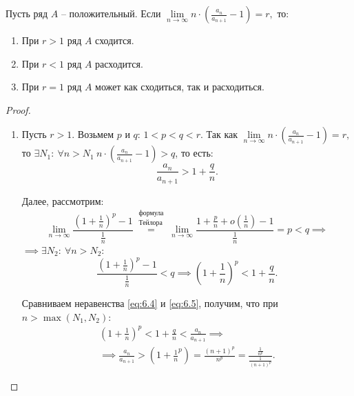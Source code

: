

\begin{theorem}
    Пусть ряд $A$ -- положительный. Если $ \underset{n\rightarrow\infty}{\lim}n \cdot \left(\frac{a_n}{a_{n+1}} - 1\right) = r, $ то:
    \begin{enumerate}
        \item При $r>1$ ряд $A$ сходится.
        \item При $r<1$ ряд $A$ расходится.
        \item При $r=1$ ряд $A$ может как сходиться, так и расходиться.
    \end{enumerate}
\end{theorem}

\begin{proof}\leavevmode
    \begin{enumerate}
        \item Пусть $r>1$. Возьмем $p$ и $q$: $ 1 < p < q < r $. Так как $ \underset{n\rightarrow\infty}{\lim}n\cdot\left(\frac{a_n}{a_{n+1}} - 1\right) = r, $ то $\exists N_1: \ \forall n > N_1 \ n\cdot\left(\frac{a_n}{a_{n+1}} - 1\right) > q$, то есть:
              \begin{equation}\label{eq:6.4}
                  \frac{a_n}{a_{n+1}} > 1 + \frac{q}{n}.
              \end{equation}

              Далее, рассмотрим:
              \[
                  \underset{n\rightarrow\infty}{\lim}\frac{(1 + \frac{1}{n})^p - 1}{\frac{1}{n}} \overset{\begin{array}{c}
                          \text{формула} \\
                          \text{Тейлора}
                      \end{array}}{=} \underset{n\rightarrow\infty}{\lim}\frac{1 + \frac{p}{n} + o(\frac{1}{n}) - 1}{\frac{1}{n}} = p < q \implies
              \]
              $\implies \exists N_2: \ \forall n > N_2$:
              \begin{equation}\label{eq:6.5}
                  \frac{(1 + \frac{1}{n})^p - 1}{\frac{1}{n}} < q \implies \left(1 + \frac{1}{n}\right)^p < 1 + \frac{q}{n}.
              \end{equation}

              Сравниваем неравенства \ref{eq:6.4} и \ref{eq:6.5}, получим, что при \\
              $n > \max(N_1,N_2)$:
              \begin{multline*}
                  \left(1 + \frac{1}{n}\right)^p < 1 + \frac{q}{n} < \frac{a_n}{a_{n+1}} \implies \\
                  \implies \frac{a_n}{a_{n+1}} > \left(1 + \frac{1}{n}^p\right) = \frac{(n+1)^p}{n^p} = \frac{\frac{1}{n^p}}{\frac{1}{(n+1)^p}}.
              \end{multline*}


\end{enumerate}
\end{proof}
